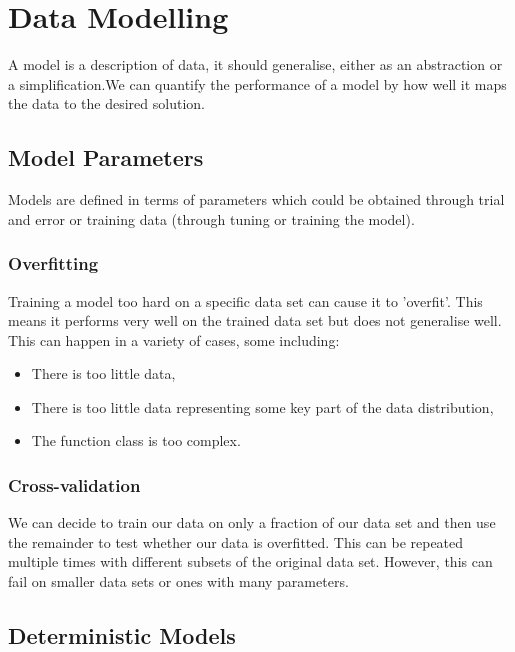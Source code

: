 \section{Data Modelling}

A model is a description of data, it should generalise, either as 
an abstraction or a simplification.We can quantify the performance 
of a model by how well it maps the data to the desired solution.

\subsection{Model Parameters}

Models are defined in terms of parameters which could be obtained
through trial and error or training data (through tuning or
training the model).

\subsubsection{Overfitting}

Training a model too hard on a specific data set can cause it
to 'overfit'. This means it performs very well on the trained
data set but does not generalise well.
\\[\baselineskip]
This can happen in a variety of cases, some including: \begin{itemize}
    \item There is too little data,
    \item There is too little data representing some
        key part of the data distribution,
    \item The function class is too complex.
\end{itemize}

\subsubsection{Cross-validation}

We can decide to train our data on only a fraction of our data set
and then use the remainder to test whether our data is overfitted.
This can be repeated multiple times with different subsets of the
original data set. However, this can fail on smaller data sets or
ones with many parameters.

\newpage

\subsection{Deterministic Models}

